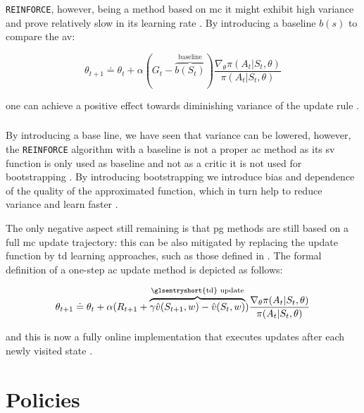 \texttt{REINFORCE}, however, being a method based on \gls{mc} it might exhibit high variance and prove relatively slow in its learning rate \citep[p. 271]{Sutton2017}. By introducing a baseline $b(s)$ to compare the \gls{av}:

\begin{equation}
	\theta_{t+1} \doteq \theta_t + \alpha (G_t - \overbrace{b(S_t)}^{\text{baseline}}) \frac{\nabla_\theta \pi(A_t|S_t,\theta)}{\pi(A_t|S_t,\theta)}
\end{equation}

one can achieve a positive effect towards diminishing variance of the update rule \citep[p. 271]{Sutton2017}.

\subsubsection{ }

By introducing a base line, we have seen that variance can be lowered, however, the \texttt{REINFORCE} algorithm with a baseline is not a proper \gls{ac} method as its \gls{sv} function is only used as baseline and not as a critic \ie it is not used for bootstrapping \citep[p. 273]{Sutton2017}. By introducing bootstrapping we introduce bias and dependence of the quality of the approximated function, which in turn help to reduce variance and learn faster \citep[p. 273]{Sutton2017}. 

The only negative aspect still remaining is that \gls{pg} methods are still based on a full \gls{mc} update trajectory: this can be also mitigated by replacing the update function by \gls{td} learning approaches, such as those defined in  \citep[p. 273]{Sutton2017}. The formal definition of a one-step \gls{ac} update method is depicted as follows:

\begin{equation}
	\theta_{t+1} \doteq \theta_t + \alpha(R_{t+1} + \overbrace{\gamma \hat{v}(S_{t+1},w)-\hat{v}(S_t,w)}^{\text{\glsentryshort{td} update}}) \frac{\nabla_\theta \pi(A_t|S_t,\theta)}{\pi(A_t|S_t,\theta)}
\end{equation}

and this is now a fully online implementation that executes updates after each newly visited state \citep[p. 274]{Sutton2017}. 

\section{ Policies}
\label{sec:rl_policies}

